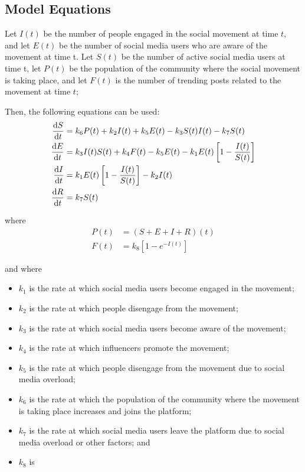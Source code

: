 \documentclass{article}
\begin{document}
    \subsection{Model Equations}

     Let $I(t)$ be the number of people engaged in the social movement at time $t$, and let $E(t)$ be the number of social media users who are aware of the movement at time t. Let $S(t)$ be the number of active social media users at time t, let $P(t)$ be the population of the community where the social movement is taking place, and let $F(t)$ is the number of trending posts related to the movement at time $t$;

    Then, the following equations can be used:
    \begin{subequations}
    \begin{align}            
        \diff St &= k_6 P(t) + k_2I(t) + k_5E(t) - k_3 {S(t)I(t)}- k_7S(t)
        \\
        \diff Et &= k_3 I(t)S(t) + k_4 F(t) - k_5E(t) - k_1E(t)\left[1 - \frac{I(t)}{S(t)}\right] 
        \\
        \diff It &= k_1 E(t) \left[1 - \frac{I(t)}{S(t)}\right] - k_2I(t)
        \\
        \diff Rt &= k_7S(t)
    \end{align}
    \end{subequations}
    
    where
    \begin{subequations}
    \begin{align}
        P(t) &= (S + E + I + R)(t)
        \\
        F(t) &= k_8\left[1- e^{-I(t)}\right]
    \end{align}
    \end{subequations}

    and where
    \begin{itemize}
        \item $k_1$ is the rate at which social media users become engaged in the movement;
        \item $k_2$ is the rate at which people disengage from the movement;
        \item $k_3$ is the rate at which social media users become aware of the movement;
        \item $k_4$ is the rate at which influencers promote the movement;
        \item $k_5$ is the rate at which people disengage from the movement due to social media overload;
        \item $k_6$ is the rate at which the population of the community where the movement is taking place increases and joins the platform;
        \item $k_7$ is the rate at which social media users leave the platform due to social media overload or other factors; and
        \item $k_8$ is
    \end{itemize}
    
\end{document}
